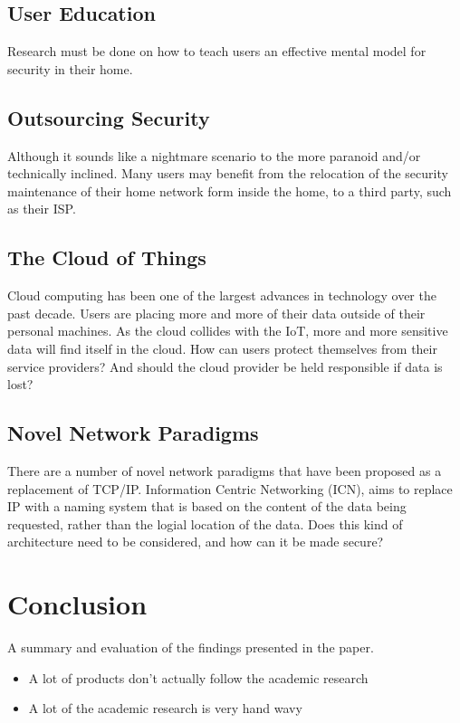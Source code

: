 \documentclass[10pt,journal,compsoc]{IEEEtran}
\begin{document}
\subsection{User Education}
Research must be done on how to teach users an effective mental model for security in their home.

\subsection{Outsourcing Security}
Although it sounds like a nightmare scenario to the more paranoid and/or
technically inclined. Many users may benefit from the relocation of the
security maintenance of their home network form inside the home, to a third
party, such as their ISP. 

\subsection{The Cloud of Things}
Cloud computing has been one of the largest advances in technology over the
past decade. Users are placing more and more of their data outside of their
personal machines. As the cloud collides with the IoT, more and more sensitive
data will find itself in the cloud. How can users protect themselves from their
service providers? And should the cloud provider be held responsible if data is
lost?

\subsection{Novel Network Paradigms}
There are a number of novel network paradigms that have been proposed as a
replacement of TCP/IP. Information Centric Networking (ICN), aims to replace IP
with a naming system that is based on the content of the data being requested,
rather than the logial location of the data. Does this kind of architecture
need to be considered, and how can it be made secure?


\section{Conclusion}
A summary and evaluation of the findings presented in the paper.

\begin{itemize}
\item A lot of products don't actually follow the academic research
\item A lot of the academic research is very hand wavy
\end{itemize}
\end{document}
